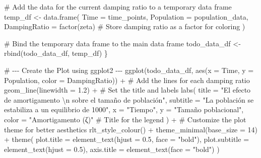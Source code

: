 \documentclass[
  12pt,
  letterpaper,
]{book}
\newenvironment{Shaded}{\begin{snugshade}}{\end{snugshade}}
\newcommand{\AttributeTok}[1]{\textcolor[rgb]{0.40,0.45,0.13}{#1}}
\newcommand{\CommentTok}[1]{\textcolor[rgb]{0.37,0.37,0.37}{#1}}
\newcommand{\DecValTok}[1]{\textcolor[rgb]{0.68,0.00,0.00}{#1}}
\newcommand{\FloatTok}[1]{\textcolor[rgb]{0.68,0.00,0.00}{#1}}
\newcommand{\FunctionTok}[1]{\textcolor[rgb]{0.28,0.35,0.67}{#1}}
\newcommand{\NormalTok}[1]{\textcolor[rgb]{0.00,0.23,0.31}{#1}}
\newcommand{\OtherTok}[1]{\textcolor[rgb]{0.00,0.23,0.31}{#1}}
\newcommand{\SpecialCharTok}[1]{\textcolor[rgb]{0.37,0.37,0.37}{#1}}
\newcommand{\StringTok}[1]{\textcolor[rgb]{0.13,0.47,0.30}{#1}}
\begin{document}
\begin{Shaded}
\begin{Highlighting}[]
  \CommentTok{\# Add the data for the current damping ratio to a temporary data frame}
\NormalTok{  temp\_df }\OtherTok{\textless{}{-}} \FunctionTok{data.frame}\NormalTok{(}
    \AttributeTok{Time =}\NormalTok{ time\_points,}
    \AttributeTok{Population =}\NormalTok{ population\_data,}
    \AttributeTok{DampingRatio =} \FunctionTok{factor}\NormalTok{(zeta) }\CommentTok{\# Store damping ratio as a factor for coloring}
\NormalTok{  )}

  \CommentTok{\# Bind the temporary data frame to the main data frame}
\NormalTok{  todo\_data\_df }\OtherTok{\textless{}{-}} \FunctionTok{rbind}\NormalTok{(todo\_data\_df, temp\_df)}
\NormalTok{\}}

\CommentTok{\# {-}{-}{-} Create the Plot using ggplot2 {-}{-}{-}}
\FunctionTok{ggplot}\NormalTok{(todo\_data\_df, }\FunctionTok{aes}\NormalTok{(}\AttributeTok{x =}\NormalTok{ Time, }\AttributeTok{y =}\NormalTok{ Population, }\AttributeTok{color =}\NormalTok{ DampingRatio)) }\SpecialCharTok{+}
  \CommentTok{\# Add the lines for each damping ratio}
  \FunctionTok{geom\_line}\NormalTok{(}\AttributeTok{linewidth =} \FloatTok{1.2}\NormalTok{) }\SpecialCharTok{+}
  \CommentTok{\# Set the title and labels}
  \FunctionTok{labs}\NormalTok{(}
    \AttributeTok{title =} \StringTok{"El efecto de amortigamento }\SpecialCharTok{\textbackslash{}n}\StringTok{ sobre el tamaño de población"}\NormalTok{,}
    \AttributeTok{subtitle =} \StringTok{"La población se estabiliza a un equilibrio de 1000"}\NormalTok{,}
    \AttributeTok{x =} \StringTok{"Tiempo"}\NormalTok{,}
    \AttributeTok{y =} \StringTok{"Tamaño poblacional"}\NormalTok{,}
    \AttributeTok{color =} \StringTok{"Amortigamento (ζ)"} \CommentTok{\# Title for the legend}
\NormalTok{  ) }\SpecialCharTok{+}
  \CommentTok{\# Customize the plot theme for better aesthetics}
  \FunctionTok{rlt\_style\_colour}\NormalTok{() }\SpecialCharTok{+}
  \FunctionTok{theme\_minimal}\NormalTok{(}\AttributeTok{base\_size =} \DecValTok{14}\NormalTok{) }\SpecialCharTok{+}
  \FunctionTok{theme}\NormalTok{(}
    \AttributeTok{plot.title =} \FunctionTok{element\_text}\NormalTok{(}\AttributeTok{hjust =} \FloatTok{0.5}\NormalTok{, }\AttributeTok{face =} \StringTok{"bold"}\NormalTok{),}
    \AttributeTok{plot.subtitle =} \FunctionTok{element\_text}\NormalTok{(}\AttributeTok{hjust =} \FloatTok{0.5}\NormalTok{),}
    \AttributeTok{axis.title =} \FunctionTok{element\_text}\NormalTok{(}\AttributeTok{face =} \StringTok{"bold"}\NormalTok{)}
\NormalTok{  )}
\end{Highlighting}
\end{Shaded}
\end{document}
